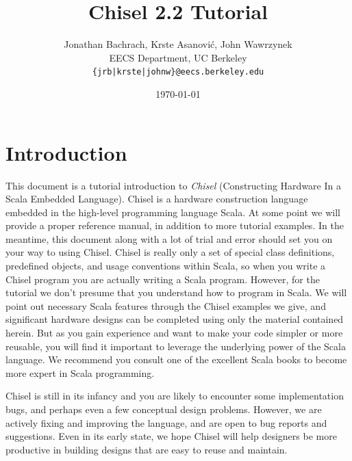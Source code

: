 \documentclass[twocolumn,10pt]{article}
\title{Chisel 2.2 Tutorial}
\author{Jonathan Bachrach, Krste Asanovi\'{c}, John Wawrzynek \\
EECS Department, UC Berkeley\\
{\tt  \{jrb|krste|johnw\}@eecs.berkeley.edu}
}
\date{\today}
\begin{document}
\maketitle{}


\section{Introduction}

This document is a tutorial introduction to {\em Chisel} (Constructing
Hardware In a Scala Embedded Language).  Chisel is a hardware
construction language embedded in the high-level programming language
Scala.  At some point we will provide a proper reference manual, in
addition to more tutorial examples.  In the meantime, this document
along with a lot of trial and error should set you on your way to
using Chisel.  Chisel is really only a set of special class
definitions, predefined objects, and usage conventions within Scala,
so when you write a Chisel program you are actually writing a Scala
program.  However, for the tutorial we don't presume that you
understand how to program in Scala.  We will point out necessary Scala
features through the Chisel examples we give, and significant hardware
designs can be completed using only the material contained herein.
But as you gain experience and want to make your code simpler or more
reusable, you will find it important to leverage the underlying power
of the Scala language. We recommend you consult one of the excellent
Scala books to become more expert in Scala programming.

Chisel is still in its infancy and you are likely to encounter some
implementation bugs, and perhaps even a few conceptual design
problems.  However, we are actively fixing and improving the language,
and are open to bug reports and suggestions.  Even in its early state,
we hope Chisel will help designers be more productive in building
designs that are easy to reuse and maintain.
\end{document}
